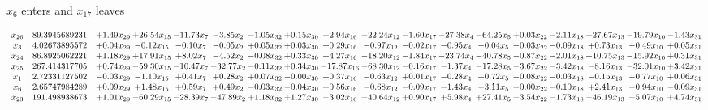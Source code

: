 \documentclass[9pt]{article}
\begin{document}
 $ x_{6} $ enters and $ x_{17} $ leaves 

 \[\begin{array}{c| c c@{\hskip 2pt} c@{\hskip 2pt} c@{\hskip 2pt} c@{\hskip 2pt} c@{\hskip 2pt} c@{\hskip 2pt} c@{\hskip 2pt} c@{\hskip 2pt} c@{\hskip 2pt} c@{\hskip 2pt} c@{\hskip 2pt} c@{\hskip 2pt} c@{\hskip 2pt} c@{\hskip 2pt} c@{\hskip 2pt} c@{\hskip 2pt} }
 x_{26}   &  89.3945689231 & +  1.49 x_{29} & + 26.54 x_{15} & -11.73 x_{7} & -3.85 x_{2} & -1.05 x_{32} & +  0.15 x_{30} & -2.94 x_{16} & -22.24 x_{12} & -1.60 x_{17} & -27.38 x_{4} & -64.25 x_{5} & +  0.03 x_{22} & -2.11 x_{18} & + 27.67 x_{13} & -19.79 x_{10} & -1.43 x_{31}\\
 x_{3}   &  4.02673895572 & +  0.04 x_{29} & -0.12 x_{15} & -0.10 x_{7} & -0.05 x_{2} & +  0.05 x_{32} & +  0.03 x_{30} & +  0.29 x_{16} & -0.97 x_{12} & -0.02 x_{17} & -0.95 x_{4} & -0.04 x_{5} & -0.03 x_{22} & -0.09 x_{18} & +  0.73 x_{13} & -0.49 x_{10} & +  0.05 x_{31}\\
 x_{24}   &  86.8925062221 & +  1.18 x_{29} & + 17.91 x_{15} & +  8.02 x_{7} & -4.52 x_{2} & -0.08 x_{32} & +  0.33 x_{30} & +  4.27 x_{16} & -18.20 x_{12} & -1.84 x_{17} & -23.74 x_{4} & -40.78 x_{5} & -0.87 x_{22} & -2.01 x_{18} & + 10.75 x_{13} & -15.92 x_{10} & +  0.31 x_{31}\\
 x_{25}   &  267.414317705 & +  0.74 x_{29} & -59.30 x_{15} & -10.47 x_{7} & -32.77 x_{2} & -0.11 x_{32} & +  0.34 x_{30} & -17.87 x_{16} & -68.30 x_{12} & -0.16 x_{17} & -1.37 x_{4} & -17.28 x_{5} & -3.67 x_{22} & -3.42 x_{18} & -8.16 x_{13} & -32.01 x_{10} & +  3.42 x_{31}\\
 x_{1}   &  2.72331127502 & -0.03 x_{29} & -1.10 x_{15} & +  0.41 x_{7} & +  0.28 x_{2} & +  0.07 x_{32} & -0.00 x_{30} & +  0.37 x_{16} & -0.63 x_{12} & +  0.01 x_{17} & -0.28 x_{4} & +  0.72 x_{5} & -0.08 x_{22} & -0.03 x_{18} & -0.15 x_{13} & -0.77 x_{10} & +  0.06 x_{31}\\
 x_{6}   &  2.65747984289 & +  0.09 x_{29} & +  1.48 x_{15} & +  0.59 x_{7} & +  0.49 x_{2} & -0.03 x_{32} & -0.04 x_{30} & +  0.56 x_{16} & -0.68 x_{12} & -0.09 x_{17} & -1.43 x_{4} & -3.11 x_{5} & -0.00 x_{22} & -0.10 x_{18} & +  2.41 x_{13} & -0.94 x_{10} & -0.09 x_{31}\\
 x_{23}   &  191.498938673 & +  1.01 x_{29} & -60.29 x_{15} & -28.39 x_{7} & -47.89 x_{2} & +  1.18 x_{32} & +  1.27 x_{30} & -3.02 x_{16} & -40.64 x_{12} & +  0.90 x_{17} & +  5.98 x_{4} & + 27.41 x_{5} & -3.54 x_{22} & -1.73 x_{18} & -46.19 x_{13} & +  5.07 x_{10} & +  4.74 x_{31}\\

\end{array}\]
\end{document}
